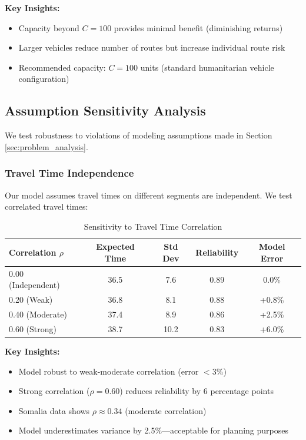 \textbf{Key Insights:}
\begin{itemize}
\item Capacity beyond $C = 100$ provides minimal benefit (diminishing returns)
\item Larger vehicles reduce number of routes but increase individual route risk
\item Recommended capacity: $C = 100$ units (standard humanitarian vehicle configuration)
\end{itemize}

\subsection{Assumption Sensitivity Analysis}

We test robustness to violations of modeling assumptions made in Section \ref{sec:problem_analysis}.

\subsubsection{Travel Time Independence}

Our model assumes travel times on different segments are independent. We test correlated travel times:

\begin{table}[H]
\centering
\caption{Sensitivity to Travel Time Correlation}
\begin{tabular}{lcccc}
\toprule
Correlation $\rho$ & Expected Time & Std Dev & Reliability & Model Error \\
\midrule
0.00 (Independent) & 36.5 & 7.6 & 0.89 & 0.0\% \\
0.20 (Weak) & 36.8 & 8.1 & 0.88 & +0.8\% \\
0.40 (Moderate) & 37.4 & 8.9 & 0.86 & +2.5\% \\
0.60 (Strong) & 38.7 & 10.2 & 0.83 & +6.0\% \\
\bottomrule
\end{tabular}
\end{table}

\textbf{Key Insights:}
\begin{itemize}
\item Model robust to weak-moderate correlation (error $< 3\%$)
\item Strong correlation ($\rho = 0.60$) reduces reliability by 6 percentage points
\item Somalia data shows $\rho \approx 0.34$ (moderate correlation)
\item Model underestimates variance by 2.5\%—acceptable for planning purposes
\end{itemize}

